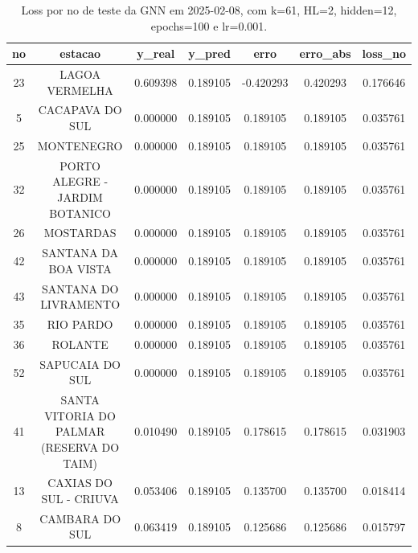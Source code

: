 \begin{table}[h]
\centering
\caption{Loss por no de teste da GNN em 2025-02-08, com k=61, HL=2, hidden=12, epochs=100 e lr=0.001.}
\label{tab:gnn_loss_k61_hl2_h12_e100_d20250208}
\begin{tabular}{ccccccc}
\toprule
no & estacao & y\_real & y\_pred & erro & erro\_abs & loss\_no \\
\midrule
23 & LAGOA VERMELHA & 0.609398 & 0.189105 & -0.420293 & 0.420293 & 0.176646 \\
5 & CACAPAVA DO SUL & 0.000000 & 0.189105 & 0.189105 & 0.189105 & 0.035761 \\
25 & MONTENEGRO & 0.000000 & 0.189105 & 0.189105 & 0.189105 & 0.035761 \\
32 & PORTO ALEGRE - JARDIM BOTANICO & 0.000000 & 0.189105 & 0.189105 & 0.189105 & 0.035761 \\
26 & MOSTARDAS & 0.000000 & 0.189105 & 0.189105 & 0.189105 & 0.035761 \\
42 & SANTANA DA BOA VISTA & 0.000000 & 0.189105 & 0.189105 & 0.189105 & 0.035761 \\
43 & SANTANA DO LIVRAMENTO & 0.000000 & 0.189105 & 0.189105 & 0.189105 & 0.035761 \\
35 & RIO PARDO & 0.000000 & 0.189105 & 0.189105 & 0.189105 & 0.035761 \\
36 & ROLANTE & 0.000000 & 0.189105 & 0.189105 & 0.189105 & 0.035761 \\
52 & SAPUCAIA DO SUL & 0.000000 & 0.189105 & 0.189105 & 0.189105 & 0.035761 \\
41 & SANTA VITORIA DO PALMAR (RESERVA DO TAIM) & 0.010490 & 0.189105 & 0.178615 & 0.178615 & 0.031903 \\
13 & CAXIAS DO SUL - CRIUVA & 0.053406 & 0.189105 & 0.135700 & 0.135700 & 0.018414 \\
8 & CAMBARA DO SUL & 0.063419 & 0.189105 & 0.125686 & 0.125686 & 0.015797 \\
\bottomrule
\end{tabular}
\end{table}
